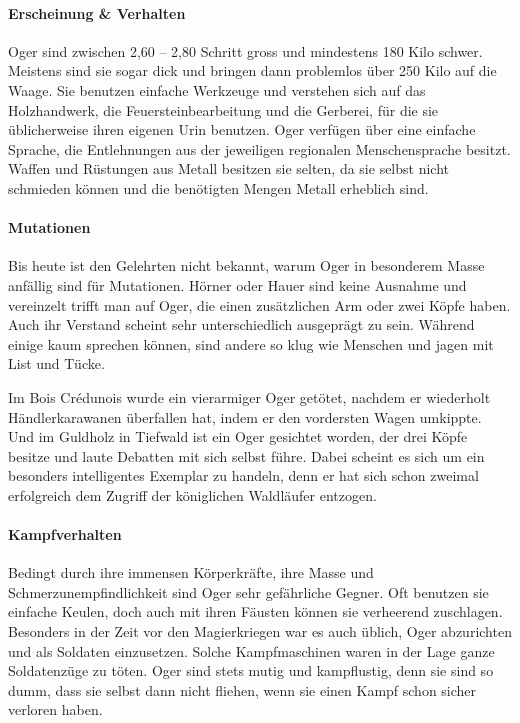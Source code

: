 \documentclass[10pt,twoside,twocolumn,openany]{book}
\begin{document}
\paragraph{Erscheinung \& Verhalten}
Oger sind zwischen 2,60 – 2,80 Schritt gross und mindestens 180 Kilo schwer. Meistens sind sie sogar dick und bringen dann problemlos über 250 Kilo auf die Waage. Sie benutzen einfache Werkzeuge und verstehen sich auf das Holzhandwerk, die Feuersteinbearbeitung und die Gerberei, für die sie üblicherweise ihren eigenen Urin benutzen.
Oger verfügen über eine einfache Sprache, die Entlehnungen aus der jeweiligen regionalen Menschensprache besitzt. Waffen und Rüstungen aus Metall besitzen sie selten, da sie selbst nicht schmieden können und die benötigten Mengen Metall erheblich sind.

\paragraph{Mutationen}
Bis heute ist den Gelehrten nicht bekannt, warum Oger in besonderem Masse anfällig sind für Mutationen. Hörner oder Hauer sind keine Ausnahme und vereinzelt trifft man auf Oger, die einen zusätzlichen Arm oder zwei Köpfe haben. Auch ihr Verstand scheint sehr unterschiedlich ausgeprägt zu sein. Während einige kaum sprechen können, sind andere so klug wie Menschen und jagen mit List und Tücke.

Im Bois Crédunois wurde ein vierarmiger Oger getötet, nachdem er wiederholt Händlerkarawanen überfallen hat, indem er den vordersten Wagen umkippte. Und im Guldholz in Tiefwald ist ein Oger gesichtet worden, der drei Köpfe besitze und laute Debatten mit sich selbst führe. Dabei scheint es sich um ein besonders intelligentes Exemplar zu handeln, denn er hat sich schon zweimal erfolgreich dem Zugriff der königlichen Waldläufer entzogen.




\paragraph{Kampfverhalten}
Bedingt durch ihre immensen Körperkräfte, ihre Masse und Schmerzunempfindlichkeit sind Oger sehr gefährliche Gegner. Oft benutzen sie einfache Keulen, doch auch mit ihren Fäusten können sie verheerend zuschlagen. Besonders in der Zeit vor den Magierkriegen war es auch üblich, Oger abzurichten und als Soldaten einzusetzen. Solche Kampfmaschinen waren in der Lage ganze  Soldatenzüge zu töten. Oger sind stets mutig und kampflustig, denn sie sind so dumm, dass sie selbst dann nicht fliehen, wenn sie einen Kampf schon sicher verloren haben.
\end{document}
